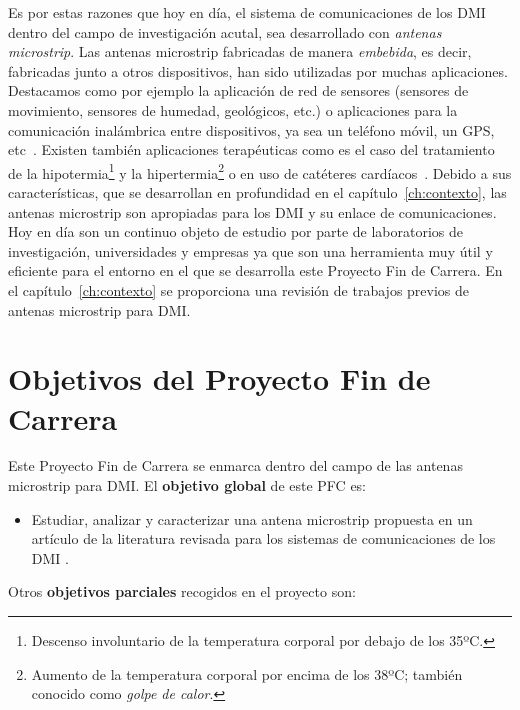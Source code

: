 Es por estas razones que hoy en día, el sistema de comunicaciones de los DMI dentro del campo de investigación acutal, sea desarrollado con \textit{antenas microstrip}. Las antenas microstrip fabricadas de manera \textit{embebida}, es decir, fabricadas junto a otros dispositivos, han sido utilizadas por muchas aplicaciones. Destacamos como por ejemplo la aplicación de red de sensores (sensores de movimiento, sensores de humedad, geológicos, etc.) o aplicaciones para la comunicación inalámbrica entre dispositivos, ya sea un teléfono móvil, un GPS, etc~\cite{garg1}. Existen también aplicaciones terapéuticas como es el caso del tratamiento de la hipotermia\footnote{Descenso involuntario de la temperatura corporal por debajo de los 35ºC.} y la hipertermia\footnote{Aumento de la temperatura corporal por encima de los 38ºC; también conocido como \textit{golpe de calor}.} o en uso de catéteres cardíacos~\cite{yang1}. Debido a sus características, que se desarrollan en profundidad en el capítulo~\ref{ch:contexto}, las antenas microstrip son apropiadas para los DMI y su enlace de comunicaciones. Hoy en día son un continuo objeto de estudio por parte de laboratorios de investigación, universidades y empresas ya que son una herramienta muy útil y eficiente para el entorno en el que se desarrolla este Proyecto Fin de Carrera. En el capítulo~\ref{ch:contexto} se proporciona una revisión de trabajos previos de antenas microstrip para DMI.


\section{Objetivos del Proyecto Fin de Carrera}\label{sec:objetivos}

Este Proyecto Fin de Carrera se enmarca dentro del campo de las antenas microstrip para DMI. El \textbf{objetivo global} de este PFC es:

\begin{itemize}

    \item Estudiar, analizar y caracterizar una antena microstrip propuesta en un artículo de la literatura revisada para los sistemas de comunicaciones de los DMI \cite{soont}.
\end{itemize}

\clearpage

\begin{flushleft}
    Otros \textbf{objetivos parciales} recogidos en el proyecto son:
\end{flushleft}


